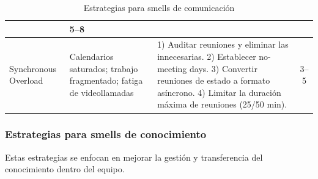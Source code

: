 \begin{table}[h]
\begin{tabularx}{\textwidth}{|l|X|X|c|}
                       & 5--8                                                                                                                       \\
        \hline
        Synchronous Overload
                       & Calendarios saturados; trabajo fragmentado; fatiga de videollamadas
                       & 1) Auditar reuniones y eliminar las innecesarias.
        2) Establecer no-meeting days.
        3) Convertir reuniones de estado a formato asíncrono.
        4) Limitar la duración máxima de reuniones (25/50 min).
                       & 3--5                                                                                                                       \\
        \hline
    \end{tabularx}
    \caption{Estrategias para smells de comunicación}
    \label{tab:estrategias-comunicacion}
\end{table}
\FloatBarrier

\subsubsection{Estrategias para smells de conocimiento}

Estas estrategias se enfocan en mejorar la gestión y transferencia del conocimiento dentro del equipo.

